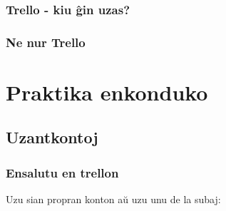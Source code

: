 \documentclass{beamer}
\begin{document}
\begin{frame}
\begin{columns}
	\end{columns}
  \end{frame}



  \begin{frame}
    \frametitle{Trello - kiu ĝin uzas?}
    
    
  \end{frame}
  
  

  \begin{frame}
    \frametitle{Ne nur Trello}
    
  \end{frame}



\section{Praktika enkonduko}
\subsection{Uzantkontoj}
  \begin{frame}
    \frametitle{Ensalutu en trellon}

	Uzu sian propran konton aŭ uzu unu de la subaj:


\end{frame}
\end{document}
